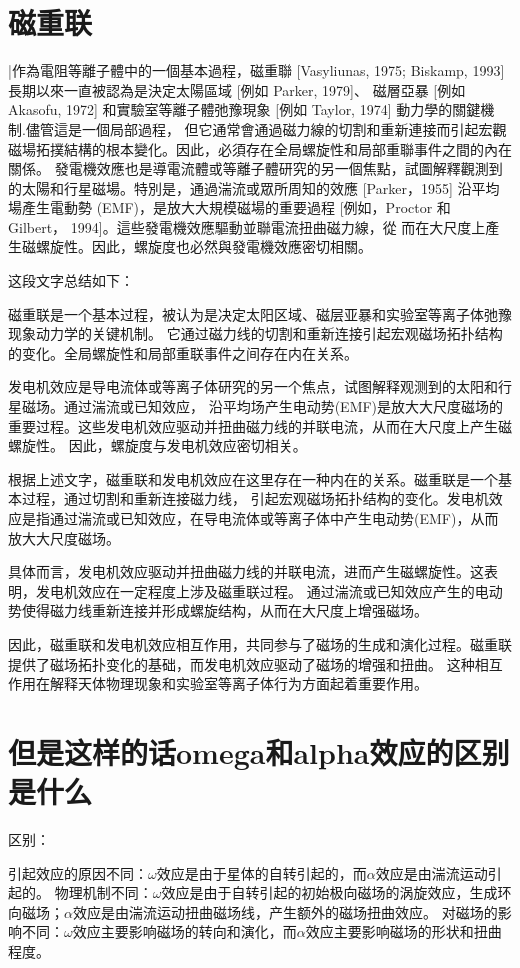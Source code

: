 \documentclass[12pt, a4paper, oneside]{ctexart}
\begin{document}
\begin{spacing}{2.0}
\section{磁重联}
|作為電阻等離子體中的一個基本過程，磁重聯 [Vasyliunas, 1975; Biskamp, 1993] 長期以來一直被認為是決定太陽區域 [例如 Parker, 1979]、
磁層亞暴 [例如 Akasofu, 1972] 和實驗室等離子體弛豫現象 [例如 Taylor, 1974] 動力學的關鍵機制.儘管這是一個局部過程，
但它通常會通過磁力線的切割和重新連接而引起宏觀磁場拓撲結構的根本變化。因此，必須存在全局螺旋性和局部重聯事件之間的內在關係。
發電機效應也是導電流體或等離子體研究的另一個焦點，試圖解釋觀測到的太陽和行星磁場。特別是，通過湍流或眾所周知的效應 [Parker，1955] 
沿平均場產生電動勢 (EMF)，是放大大規模磁場的重要過程 [例如，Proctor 和 Gilbert， 1994]。這些發電機效應驅動並聯電流扭曲磁力線，從
而在大尺度上產生磁螺旋性。因此，螺旋度也必然與發電機效應密切相關。

这段文字总结如下：

磁重联是一个基本过程，被认为是决定太阳区域、磁层亚暴和实验室等离子体弛豫现象动力学的关键机制。
它通过磁力线的切割和重新连接引起宏观磁场拓扑结构的变化。全局螺旋性和局部重联事件之间存在内在关系。

发电机效应是导电流体或等离子体研究的另一个焦点，试图解释观测到的太阳和行星磁场。通过湍流或已知效应，
沿平均场产生电动势(EMF)是放大大尺度磁场的重要过程。这些发电机效应驱动并扭曲磁力线的并联电流，从而在大尺度上产生磁螺旋性。
因此，螺旋度与发电机效应密切相关。

根据上述文字，磁重联和发电机效应在这里存在一种内在的关系。磁重联是一个基本过程，通过切割和重新连接磁力线，
引起宏观磁场拓扑结构的变化。发电机效应是指通过湍流或已知效应，在导电流体或等离子体中产生电动势(EMF)，从而放大大尺度磁场。

具体而言，发电机效应驱动并扭曲磁力线的并联电流，进而产生磁螺旋性。这表明，发电机效应在一定程度上涉及磁重联过程。
通过湍流或已知效应产生的电动势使得磁力线重新连接并形成螺旋结构，从而在大尺度上增强磁场。

因此，磁重联和发电机效应相互作用，共同参与了磁场的生成和演化过程。磁重联提供了磁场拓扑变化的基础，而发电机效应驱动了磁场的增强和扭曲。
这种相互作用在解释天体物理现象和实验室等离子体行为方面起着重要作用。




\section{但是这样的话omega和alpha效应的区别是什么}
区别：

引起效应的原因不同：$\omega$效应是由于星体的自转引起的，而$\alpha$效应是由湍流运动引起的。
物理机制不同：$\omega$效应是由于自转引起的初始极向磁场的涡旋效应，生成环向磁场；$\alpha$效应是由湍流运动扭曲磁场线，产生额外的磁场扭曲效应。
对磁场的影响不同：$\omega$效应主要影响磁场的转向和演化，而$\alpha$效应主要影响磁场的形状和扭曲程度。

\end{spacing}
\end{document}

